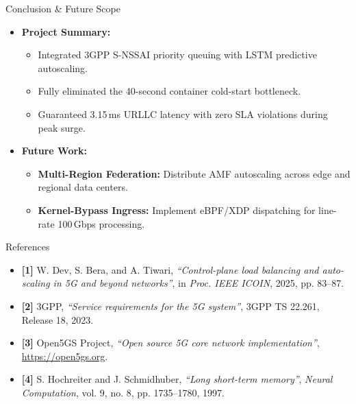 \documentclass[aspectratio=169,11pt]{beamer}
\begin{document}
\begin{frame}{Conclusion \& Future Scope}
  \begin{itemize}
    \setlength\itemsep{1.3em}
    \item \textbf{Project Summary:}
      \begin{itemize}
        \item Integrated 3GPP S-NSSAI priority queuing with LSTM predictive autoscaling.
        \item Fully eliminated the 40-second container cold-start bottleneck.
        \item Guaranteed 3.15\,ms URLLC latency with zero SLA violations during peak surge.
      \end{itemize}
    \item \textbf{Future Work:}
      \begin{itemize}
        \item \textbf{Multi-Region Federation:} Distribute AMF autoscaling across edge and regional data centers.
        \item \textbf{Kernel-Bypass Ingress:} Implement eBPF/XDP dispatching for line-rate 100\,Gbps processing.
      \end{itemize}
  \end{itemize}
\end{frame}

\begin{frame}{References}
  \begin{itemize}
    \setlength\itemsep{1.2em}
    \item \textbf{[1]} W. Dev, S. Bera, and A. Tiwari, \emph{``Control-plane load balancing and auto-scaling in 5G and beyond networks''}, in \emph{Proc. IEEE ICOIN}, 2025, pp. 83--87.
    \item \textbf{[2]} 3GPP, \emph{``Service requirements for the 5G system''}, 3GPP TS 22.261, Release 18, 2023.
    \item \textbf{[3]} Open5GS Project, \emph{``Open source 5G core network implementation''}, \url{https://open5gs.org}.
    \item \textbf{[4]} S. Hochreiter and J. Schmidhuber, \emph{``Long short-term memory''}, \emph{Neural Computation}, vol. 9, no. 8, pp. 1735--1780, 1997.
  \end{itemize}
\end{frame}
\end{document}
